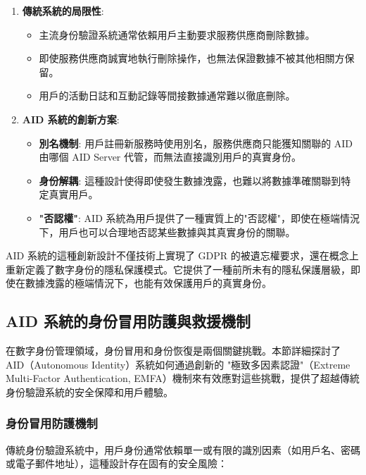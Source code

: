 \begin{enumerate}
  \item \textbf{傳統系統的局限性}:
        \begin{itemize}
          \item 主流身份驗證系統通常依賴用戶主動要求服務供應商刪除數據。
          \item 即使服務供應商誠實地執行刪除操作，也無法保證數據不被其他相關方保留。
          \item 用戶的活動日誌和互動記錄等間接數據通常難以徹底刪除。
        \end{itemize}

  \item \textbf{AID 系統的創新方案}:
        \begin{itemize}
          \item \textbf{別名機制}: 用戶註冊新服務時使用別名，服務供應商只能獲知關聯的 AID 由哪個 AID Server 代管，而無法直接識別用戶的真實身份。
          \item \textbf{身份解耦}: 這種設計使得即使發生數據洩露，也難以將數據準確關聯到特定真實用戶。
          \item \textbf{"否認權"}: AID 系統為用戶提供了一種實質上的"否認權"，即使在極端情況下，用戶也可以合理地否認某些數據與其真實身份的關聯。
        \end{itemize}
\end{enumerate}

AID 系統的這種創新設計不僅技術上實現了 GDPR 的被遺忘權要求，還在概念上重新定義了數字身份的隱私保護模式。它提供了一種前所未有的隱私保護層級，即使在數據洩露的極端情況下，也能有效保護用戶的真實身份。

\subsection{AID 系統的身份冒用防護與救援機制}

在數字身份管理領域，身份冒用和身份恢復是兩個關鍵挑戰。本節詳細探討了 AID（Autonomous Identity）系統如何通過創新的 "極致多因素認證"（Extreme Multi-Factor Authentication, EMFA）機制來有效應對這些挑戰，提供了超越傳統身份驗證系統的安全保障和用戶體驗。

\subsubsection{身份冒用防護機制}

傳統身份驗證系統中，用戶身份通常依賴單一或有限的識別因素（如用戶名、密碼或電子郵件地址），這種設計存在固有的安全風險：

